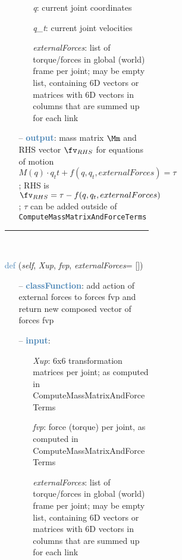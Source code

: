 \begin{itemize}[leftmargin=1.4cm]
\begin{itemize}[leftmargin=1.4cm]
\begin{itemize}[leftmargin=0.5cm]
\begin{itemize}[leftmargin=1.4cm]
\begin{itemize}[leftmargin=1.4cm]
\begin{itemize}[leftmargin=0.5cm]
\begin{itemize}[leftmargin=1.4cm]
\begin{itemize}[leftmargin=0.5cm]
\begin{itemize}[leftmargin=1.4cm]
\begin{itemize}[leftmargin=1.4cm]
\begin{itemize}[leftmargin=1.4cm]
\begin{itemize}[leftmargin=0.7cm]
\begin{itemize}[leftmargin=1.2cm]
\setlength{\itemindent}{-0.7cm}
\item[]{\it q}: current joint coordinates
\item[]{\it q\_t}: current joint velocities
\item[]{\it externalForces}: list of torque/forces in global (world) frame per joint; may be empty list, containing 6D vectors or matrices with 6D vectors in columns that are summed up for each link
\end{itemize}
\item[--]\textcolor{steelblue}{\bf output}: mass matrix $\Mm$ and RHS vector $\fv_{RHS}$ for equations of motion $M(q) \cdot q_tt + f(q,q_t,externalForces) = \tau$; RHS is $\fv_{RHS}=\tau - f(q,q_t,externalForces)$; $\tau$ can be added outside of \texttt{ComputeMassMatrixAndForceTerms}
\vspace{12pt}\end{itemize}
%
\noindent\rule{8cm}{0.75pt}\vspace{1pt} \\ 
\begin{flushleft}
\noindent \textcolor{steelblue}{def {\bf {}}}\label{sec:kinematicTree:KinematicTree66:AddExternalForces}
({\it self}, {\it Xup}, {\it fvp}, {\it externalForces}= [])
\end{flushleft}
\setlength{\itemindent}{0.7cm}
\begin{itemize}[leftmargin=0.7cm]
\item[--]\textcolor{steelblue}{\bf classFunction}: add action of external forces to forces fvp and return new composed vector of forces fvp
\item[--]\textcolor{steelblue}{\bf input}: \vspace{-6pt}
\begin{itemize}[leftmargin=1.2cm]
\setlength{\itemindent}{-0.7cm}
\item[]{\it Xup}: 6x6 transformation matrices per joint; as computed in ComputeMassMatrixAndForceTerms
\item[]{\it fvp}: force (torque) per joint, as computed in ComputeMassMatrixAndForceTerms
\item[]{\it externalForces}: list of torque/forces in global (world) frame per joint; may be empty list, containing 6D vectors or matrices with 6D vectors in columns that are summed up for each link
\end{itemize}

\end{itemize}
\end{itemize}
\end{itemize}
\end{itemize}
\end{itemize}
\end{itemize}
\end{itemize}
\end{itemize}
\end{itemize}
\end{itemize}
\end{itemize}
\end{itemize}
